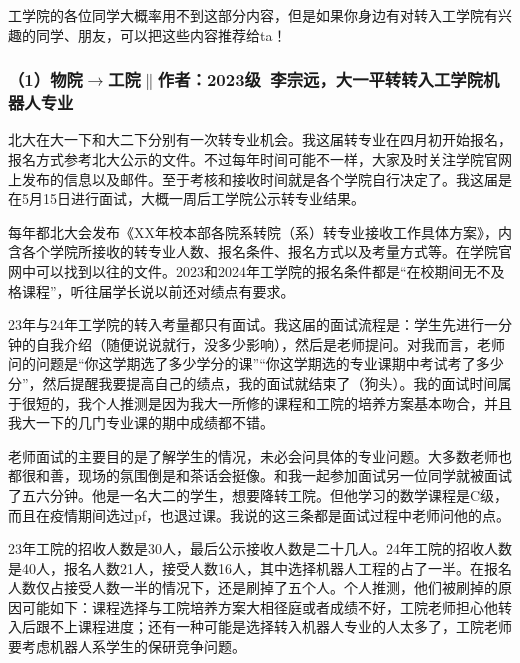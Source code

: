 \documentclass[11pt,oneside]{book}
\begin{document}
工学院的各位同学大概率用不到这部分内容，但是如果你身边有对转入工学院有兴趣的同学、朋友，可以把这些内容推荐给ta！

\subsubsection{（1）物院$\to$工院$\parallel$作者：2023级\ 李宗远，大一平转转入工学院机器人专业}

北大在大一下和大二下分别有一次转专业机会。我这届转专业在四月初开始报名，报名方式参考北大公示的文件。不过每年时间可能不一样，大家及时关注学院官网上发布的信息以及邮件。至于考核和接收时间就是各个学院自行决定了。我这届是在5月15日进行面试，大概一周后工学院公示转专业结果。

\vspace{10pt}

每年都北大会发布《XX年校本部各院系转院（系）转专业接收工作具体方案》，内含各个学院所接收的转专业人数、报名条件、报名方式以及考量方式等。在学院官网中可以找到以往的文件。2023和2024年工学院的报名条件都是“在校期间无不及格课程”，听往届学长说以前还对绩点有要求。

\vspace{10pt}

23年与24年工学院的转入考量都只有面试。我这届的面试流程是：学生先进行一分钟的自我介绍（随便说说就行，没多少影响），然后是老师提问。对我而言，老师问的问题是“你这学期选了多少学分的课”“你这学期选的专业课期中考试考了多少分”，然后提醒我要提高自己的绩点，我的面试就结束了（狗头）。我的面试时间属于很短的，我个人推测是因为我大一所修的课程和工院的培养方案基本吻合，并且我大一下的几门专业课的期中成绩都不错。

\vspace{10pt}

老师面试的主要目的是了解学生的情况，未必会问具体的专业问题。大多数老师也都很和善，现场的氛围倒是和茶话会挺像。和我一起参加面试另一位同学就被面试了五六分钟。他是一名大二的学生，想要降转工院。但他学习的数学课程是C级，而且在疫情期间选过pf，也退过课。我说的这三条都是面试过程中老师问他的点。

\vspace{10pt}

23年工院的招收人数是30人，最后公示接收人数是二十几人。24年工院的招收人数是40人，报名人数21人，接受人数16人，其中选择机器人工程的占了一半。在报名人数仅占接受人数一半的情况下，还是刷掉了五个人。个人推测，他们被刷掉的原因可能如下：课程选择与工院培养方案大相径庭或者成绩不好，工院老师担心他转入后跟不上课程进度；还有一种可能是选择转入机器人专业的人太多了，工院老师要考虑机器人系学生的保研竞争问题。
\end{document}
